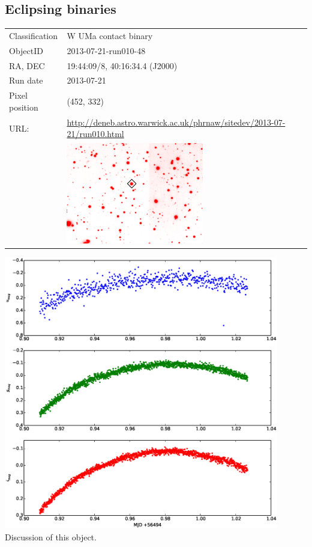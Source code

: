 \newpage
\subsection{Eclipsing binaries}

  \begin{tabular}{l l}
  Classification & {W UMa} contact binary \\
  ObjectID & 2013-07-21-run010-48 \\
  RA, DEC & 19:44:09/8, 40:16:34.4 (J2000) \\
  Run date & 2013-07-21 \\
  Pixel position & (452, 332) \\
  URL: & \small \url{http://deneb.astro.warwick.ac.uk/phrnaw/sitedev/2013-07-21/run010.html} \\
       & \includegraphics[width=60mm]{images/2013-07-21-run010-48.png} \\
  \end{tabular}
  \includegraphics[width=120mm]{images/2013-07-21-run010-48_lightcurve.eps} \\
  Discussion of this object.


